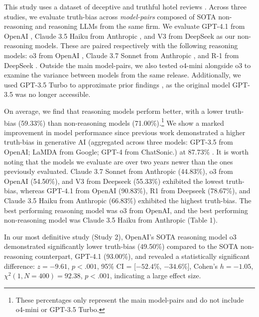 \documentclass{article}
\begin{document}
This study uses a dataset of deceptive and truthful hotel reviews \citep{ott_finding_2011}. Across three studies, we evaluate truth-bias across \textit{model-pairs} composed of SOTA non-reasoning and reasoning LLMs from the same firm. We evaluate GPT-4.1 from OpenAI \citep{OpenAI_4-1_API_2025}, Claude 3.5 Haiku from Anthropic \citep{anthropic_claude_2024}, and V3 from DeepSeek \citep{deepseekai2025deepseekv3technicalreport} as our non-reasoning models. These are paired respectively with the following reasoning models: o3 from OpenAI \citep{openai_o3_o4m_systemcard2024}, Claude 3.7 Sonnet from Anthropic \citep{anthropic_claude_2025}, and R-1 from DeepSeek \citep{deepseek-ai_deepseek-r1_2025}. Outside the main model-pairs, we also tested o4-mini \citep{openai_o3_o4m_systemcard2024} alongside o3 to examine the variance between models from the same release. Additionally, we used GPT-3.5 Turbo \citep{openai_gpt-3-5-turbo} to approximate prior findings \citep{markowitz_generative_2024}, as the original model GPT-3.5 was no longer accessible.

On average, we find that reasoning models perform better, with a lower truth-bias (59.33\%) than non-reasoning models (71.00\%).\footnote{These percentages only represent the main model-pairs and do not include o4-mini or GPT-3.5 Turbo.} We show a marked improvement in model performance since previous work demonstrated a higher truth-bias in generative AI (aggregated across three models: GPT-3.5 from OpenAI; LaMDA from Google; GPT-4 from ChatSonic.) at 87.73\% \citep{markowitz_generative_2024}. It is worth noting that the models we evaluate are over two years newer than the ones previously evaluated. Claude 3.7 Sonnet from Anthropic (44.83\%), o3 from OpenAI (54.50\%), and V3 from Deepseek (55.33\%) exhibited the lowest truth-bias, whereas GPT-4.1 from OpenAI (90.83\%), R1 from Deepseek (78.67\%), and Claude 3.5 Haiku from Anthropic (66.83\%) exhibited the highest truth-bias. The best performing reasoning model was o3 from OpenAI, and the best performing non-reasoning model was Claude 3.5 Haiku from Anthropic (Table 1).

In our most definitive study (Study 2), OpenAI's SOTA reasoning model o3 demonstrated significantly lower truth-bias (49.50\%) compared to the SOTA non-reasoning counterpart, GPT-4.1 (93.00\%), and revealed a statistically significant difference: $z = -9.61$, $p < .001$, 95\% CI = [$-52.4\%$, $-34.6\%$], Cohen’s $h = -1.05$, $\chi^2(1, N = 400) = 92.38$, $p < .001$, indicating a large effect size.
\end{document}

